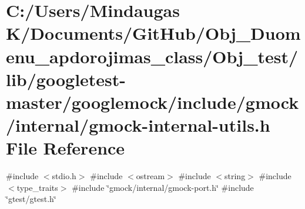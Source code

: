 \hypertarget{_obj__test_2lib_2googletest-master_2googlemock_2include_2gmock_2internal_2gmock-internal-utils_8h}{}\section{C\+:/\+Users/\+Mindaugas K/\+Documents/\+Git\+Hub/\+Obj\+\_\+\+Duomenu\+\_\+apdorojimas\+\_\+class/\+Obj\+\_\+test/lib/googletest-\/master/googlemock/include/gmock/internal/gmock-\/internal-\/utils.h File Reference}
\label{_obj__test_2lib_2googletest-master_2googlemock_2include_2gmock_2internal_2gmock-internal-utils_8h}
{\ttfamily \#include $<$stdio.\+h$>$}\newline
{\ttfamily \#include $<$ostream$>$}\newline
{\ttfamily \#include $<$string$>$}\newline
{\ttfamily \#include $<$type\+\_\+traits$>$}\newline
{\ttfamily \#include \char`\"{}gmock/internal/gmock-\/port.\+h\char`\"{}}\newline
{\ttfamily \#include \char`\"{}gtest/gtest.\+h\char`\"{}}\newline
